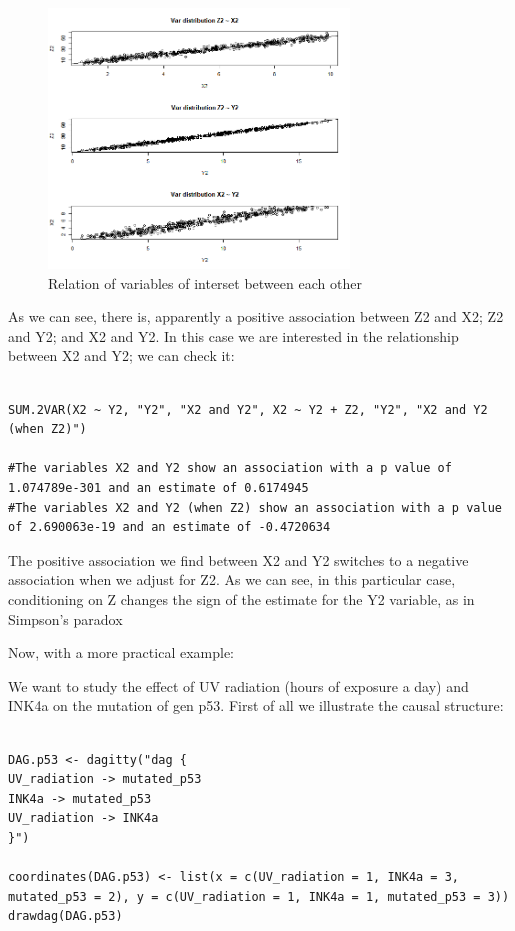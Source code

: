 \documentclass{article}
\begin{document}
\begin{figure}[h]
\caption{Relation of variables of interset between each other}
\includegraphics[width=8cm]{PLOT_CASE2.png}
\centering
\end{figure}

As we can see, there is, apparently a positive association between Z2 and X2;  Z2 and Y2; and X2 and Y2. In this case we are interested in the relationship between X2 and Y2; we can check it: \par
\begin{lstlisting}

SUM.2VAR(X2 ~ Y2, "Y2", "X2 and Y2", X2 ~ Y2 + Z2, "Y2", "X2 and Y2 (when Z2)")

#The variables X2 and Y2 show an association with a p value of 1.074789e-301 and an estimate of 0.6174945 
#The variables X2 and Y2 (when Z2) show an association with a p value of 2.690063e-19 and an estimate of -0.4720634 

\end{lstlisting}

The positive association we find between X2 and Y2 switches to a negative association when we adjust for Z2. As we can see, in this particular case, conditioning on Z changes the sign of the estimate for the Y2 variable, as in Simpson's paradox\par


Now, with a more practical example: \par
We want to study the effect of UV radiation (hours of exposure a day) and INK4a on the mutation of gen p53. First of all we illustrate the causal structure:\par

\begin{lstlisting}

DAG.p53 <- dagitty("dag {
UV_radiation -> mutated_p53
INK4a -> mutated_p53
UV_radiation -> INK4a
}")

coordinates(DAG.p53) <- list(x = c(UV_radiation = 1, INK4a = 3, mutated_p53 = 2), y = c(UV_radiation = 1, INK4a = 1, mutated_p53 = 3))
drawdag(DAG.p53)

\end{lstlisting}
\end{document}
